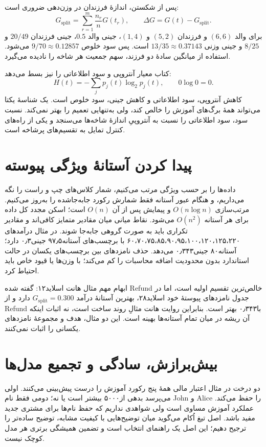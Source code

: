 \documentclass[12pt,a4paper,oneside]{report}
\begin{document}
پس از شکستن، اندازهٔ فرزندان در وزن‌دهی ضروری است:
\[G_{\mathrm{split}}=\sum_{r=1}^m\frac{n_r}{n}G(t_r),\qquad \Delta G=G(t)-G_{\mathrm{split}}.\]
برای والد $(6,6)$ و فرزندان $(5,2)$ و $(1,4)$، جینی والد $0.5$، جینی فرزندان $20/49$ و $8/25$ و جینی وزنی $13/35\approx0.37143$ است. پس سود خلوص $9/70\approx0.12857$ می‌شود. استفاده از میانگین سادهٔ دو فرزند، سهم جمعیت هر شاخه را نادیده می‌گیرد.

کتاب معیار آنتروپی و سود اطلاعاتی را نیز بسط می‌دهد:
\[H(t)=-\sum_j p_j(t)\log_2p_j(t),\qquad 0\log 0=0.\]
کاهش آنتروپی، سود اطلاعاتی و کاهش جینی، سود خلوص است. یک شناسهٔ یکتا می‌تواند همهٔ برگ‌های آموزش را خالص کند، ولی به‌تنهایی تعمیم را بهتر نمی‌کند. نسبت سود، سود اطلاعاتی را نسبت به آنتروپیِ اندازهٔ شاخه‌ها می‌سنجد و یکی از راه‌های کنترل تمایل به تقسیم‌های پرشاخه است.

\section{پیدا کردن آستانهٔ ویژگی پیوسته}

داده‌ها را بر حسب ویژگی مرتب می‌کنیم، شمار کلاس‌های چپ و راست را نگه می‌داریم، و هنگام عبور آستانه فقط شمارش رکورد جابه‌جا‌شده را به‌روز می‌کنیم. مرتب‌سازی $O(n\log n)$ و پیمایش پس از آن $O(n)$ است؛ اسکن مجدد کل داده برای هر آستانه $O(n^2)$ می‌شود. نقاط میانی میان مقادیر متمایز کافی‌اند و مقادیر تکراری باید به صورت گروهی جابه‌جا شوند. در مثال درآمدهای ۶۰،۷۰،۷۵،۸۵،۹۰،۹۵،۱۰۰،۱۲۰،۱۲۵،۲۲۰ با برچسب‌های  آستانه۹۷٫۵ جینی۰٫۳ دارد؛ آستانه۸۰ جینی۰٫۳۴۳ می‌دهد. حذف نامزدهای بین برچسب‌های یکسان در حالت استاندارد بدون محدودیت اضافه محاسبات را کم می‌کند؛ با وزن‌ها یا قیود خاص باید احتیاط کرد.

ابهام مهم مثال هانت اسلاید۱۲: گفته شده Refund خالص‌ترین تقسیم اولیه است، اما در جدول نامزدهای پیوستهٔ خود اسلاید۲۸، بهترین آستانهٔ درآمد $G_{\mathrm{split}}=0.300$ دارد و از Refund با۰٫۳۴۳ بهتر است. بنابراین روایت هانت مثالِ روند ساخت است، نه اثبات اینکه آن ریشه در میان تمام آستانه‌ها بهینه است. این دو مثال، هدف و مجموعهٔ نامزدهای یکسانی را اثبات نمی‌کنند.



\section{بیش‌برازش، سادگی و تجمیع مدل‌ها}

دو درخت در مثال اعتبار مالی همهٔ پنج رکورد آموزش را درست پیش‌بینی می‌کنند. اولی می‌پرسد بدهی از۵۰۰۰ بیشتر است یا نه؛ دومی فقط نام John و Alice را حفظ می‌کند. عملکرد آموزش مساوی است ولی شواهدی نداریم که حفظ نام‌ها برای مشتری جدید مفید باشد. اصل تیغ اُکام می‌گوید میان توضیح‌هایی با کیفیت مشابه، توضیح ساده‌تر را ترجیح دهیم؛ این اصل یک راهنمای انتخاب است و تضمین همیشگی برتری هر مدل کوچک نیست.
\end{document}
